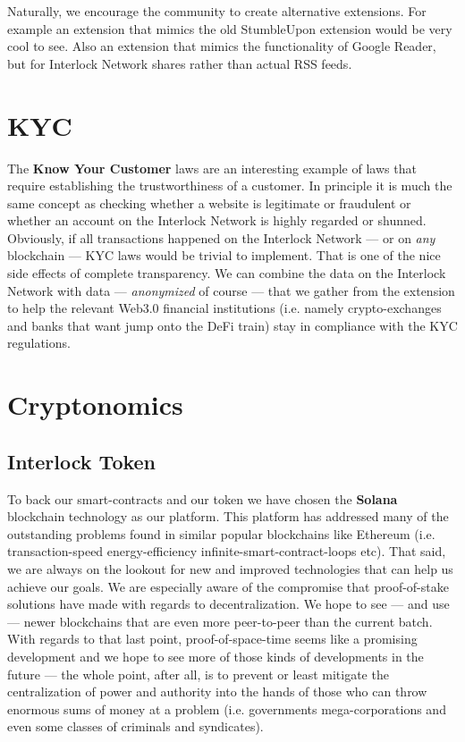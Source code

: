 \documentclass[a4paper]{article}
\begin{document}
Naturally, we encourage the community to create alternative extensions. For example an extension that mimics the old StumbleUpon extension would be very cool to see. Also an extension that mimics the functionality of Google Reader, but for Interlock Network shares rather than actual RSS feeds.
\section{KYC}
\label{KYC}

The \textbf{Know Your Customer} laws are an interesting example of laws that require establishing the trustworthiness of a customer. In principle it is much the same concept as checking whether a website is legitimate or fraudulent or whether an account on the Interlock Network is highly regarded or shunned. Obviously, if all transactions happened on the Interlock Network ---  or on \emph{any} blockchain ---  KYC laws would be trivial to implement. That is one of the nice side effects of complete transparency. We can combine the data on the Interlock Network with data ---  \emph{anonymized} of course ---  that we gather from the extension to help the relevant Web3.0 financial institutions (i.e. namely crypto-exchanges and banks that want jump onto the DeFi train) stay in compliance with the KYC regulations.
\section{Cryptonomics}
\label{Cryptonomics}
\subsection{Interlock Token}
\label{Interlock Token}

To back our smart-contracts and our token we have chosen the \textbf{Solana} blockchain technology as our platform. This platform has addressed many of the outstanding problems found in similar popular blockchains like Ethereum (i.e. transaction-speed energy-efficiency infinite-smart-contract-loops etc). That said, we are always on the lookout for new and improved technologies that can help us achieve our goals. We are especially aware of the compromise that proof-of-stake solutions have made with regards to decentralization. We hope to see ---  and use ---  newer blockchains that are even more peer-to-peer than the current batch. With regards to that last point, proof-of-space-time seems like a promising development and we hope to see more of those kinds of developments in the future ---  the whole point, after all, is to prevent or least mitigate the centralization of power and authority into the hands of those who can throw enormous sums of money at a problem (i.e. governments mega-corporations and even some classes of criminals and syndicates).
\end{document}
